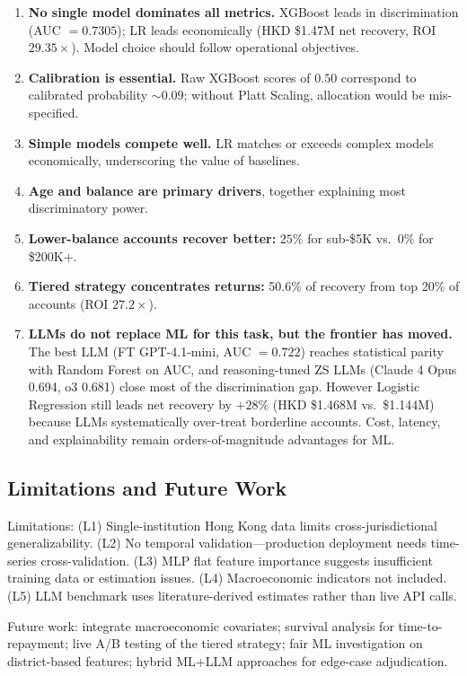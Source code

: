 \documentclass[12pt, a4paper]{article}
\begin{document}
\begin{enumerate}[label=(\Roman*), leftmargin=*]
    \item \textbf{No single model dominates all metrics.} XGBoost leads in discrimination (AUC $= 0.7305$); LR leads economically (HKD \$1.47M net recovery, ROI $29.35\times$). Model choice should follow operational objectives.
    \item \textbf{Calibration is essential.} Raw XGBoost scores of $0.50$ correspond to calibrated probability ${\sim}0.09$; without Platt Scaling, allocation would be mis-specified.
    \item \textbf{Simple models compete well.} LR matches or exceeds complex models economically, underscoring the value of baselines.
    \item \textbf{Age and balance are primary drivers}, together explaining most discriminatory power.
    \item \textbf{Lower-balance accounts recover better:} $25\%$ for sub-\$5K vs.\ $0\%$ for \$200K+.
    \item \textbf{Tiered strategy concentrates returns:} 50.6\% of recovery from top 20\% of accounts (ROI $27.2\times$).
    \item \textbf{LLMs do not replace ML for this task, but the frontier has moved.} The best LLM (FT GPT-4.1-mini, AUC $= 0.722$) reaches statistical parity with Random Forest on AUC, and reasoning-tuned ZS LLMs (Claude 4 Opus 0.694, o3 0.681) close most of the discrimination gap. However Logistic Regression still leads net recovery by $+28\%$ (HKD \$1.468M vs.\ \$1.144M) because LLMs systematically over-treat borderline accounts. Cost, latency, and explainability remain orders-of-magnitude advantages for ML.
\end{enumerate}

\subsection{Limitations and Future Work}

Limitations: (L1) Single-institution Hong Kong data limits cross-jurisdictional generalizability. (L2) No temporal validation---production deployment needs time-series cross-validation. (L3) MLP flat feature importance suggests insufficient training data or estimation issues. (L4) Macroeconomic indicators not included. (L5) LLM benchmark uses literature-derived estimates rather than live API calls.

Future work: integrate macroeconomic covariates; survival analysis for time-to-repayment; live A/B testing of the tiered strategy; fair ML investigation on district-based features; hybrid ML+LLM approaches for edge-case adjudication.
\end{document}
